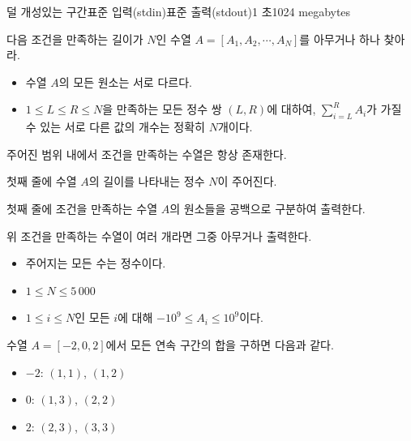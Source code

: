 \def\probtitle{덜 개성있는 구간}
\def\probno{F} %

\begin{problem}{\probtitle}{표준 입력(stdin)}{표준 출력(stdout)}{1 초}{1024 megabytes}

다음 조건을 만족하는 길이가 $N$인 수열 $A = [A_1, A_2, \cdots, A_N]$를 아무거나 하나 찾아라.

\begin{itemize}[topsep=0pt,noitemsep]
    \item 수열 $A$의 모든 원소는 서로 다르다.
    \item $1 \le L \le R \le N$을 만족하는 모든 정수 쌍 $(L, R)$에 대하여, $\sum\limits_{i=L}^R A_i$가 가질 수 있는 서로 다른 값의 개수는 정확히 $N$개이다.
\end{itemize}

주어진 범위 내에서 조건을 만족하는 수열은 항상 존재한다.

\InputFile

첫째 줄에 수열 $A$의 길이를 나타내는 정수 $N$이 주어진다.

\OutputFile

첫째 줄에 조건을 만족하는 수열 $A$의 원소들을 공백으로 구분하여 출력한다.

위 조건을 만족하는 수열이 여러 개라면 그중 아무거나 출력한다.

\Constraints

\begin{itemize}[topsep=0pt,noitemsep]
    \item 주어지는 모든 수는 정수이다.
    \item $1 \le N \le 5\, 000$
    \item $1 \le i \le N$인 모든 $i$에 대해 $-10^{9} \le A_i \le 10^{9}$이다.
\end{itemize}

\Example

\begin{example}
\end{example}

\Notes

수열 $A = [-2, 0, 2]$에서 모든 연속 구간의 합을 구하면 다음과 같다.

\begin{itemize}[topsep=0pt,noitemsep]
    \item $-2$: $(1, 1)$, $(1, 2)$
    \item $0$: $(1, 3)$, $(2, 2)$
    \item $2$: $(2, 3)$, $(3, 3)$
\end{itemize}

\end{problem}